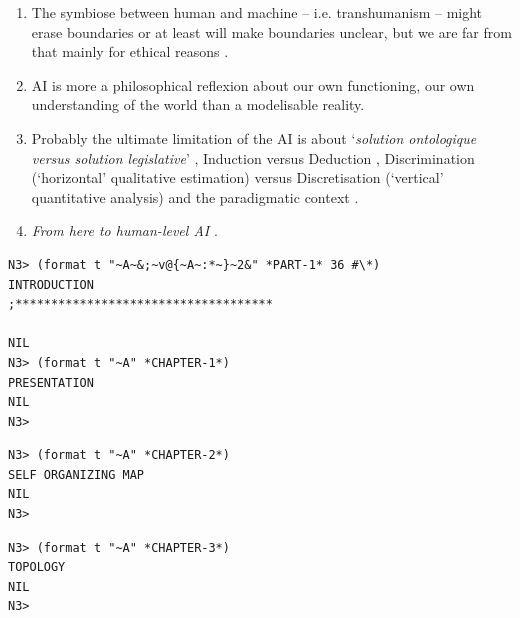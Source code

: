 \documentclass{article}
\begin{document}
\begin{enumerate}[leftmargin=*,label=\underline{\textit{Statement} \arabic*} :]
\item The symbiose between human and machine -- i.e. transhumanism --  might erase boundaries or at least will make boundaries unclear, but we are far from that mainly for ethical reasons \citep{hgw}.  
\item AI is more a philosophical reflexion about our own functioning, our own understanding of the world than a modelisable reality.
\item Probably the ultimate limitation of the AI is about `\textit{solution ontologique versus solution legislative}' \citep{cse}, Induction versus Deduction \citep{fxd}, Discrimination (`horizontal' qualitative estimation) versus  Discretisation (`vertical' quantitative analysis) and the paradigmatic context \citep{herz}.
\item \textit{From here to human-level AI} \citep{jmc}.
\end{enumerate}

\newpage
\begin{spacing}{0.1}
\renewcommand*\contentsname{Contents}
\tableofcontents
\end{spacing}

\bigskip
\bigskip
\renewcommand*\listfigurename{List of figures}
\listoffigures

\bigskip
\bigskip
\renewcommand*{\listtablename}{List of tables}
\listoftables

\bigskip
\bigskip
\bigskip

\begin{lstlisting}[language=sectitle]
N3> (format t "~A~&;~v@{~A~:*~}~2&" *PART-1* 36 #\*)
INTRODUCTION
;************************************

NIL
N3> (format t "~A" *CHAPTER-1*)
PRESENTATION
NIL
N3> 
\end{lstlisting}
{}

\bigskip

\bigskip

\begin{lstlisting}[language=sectitle]
N3> (format t "~A" *CHAPTER-2*)
SELF ORGANIZING MAP
NIL
N3> 
\end{lstlisting}

\bigskip

\bigskip

\begin{lstlisting}[language=sectitle]
N3> (format t "~A" *CHAPTER-3*)
TOPOLOGY
NIL
N3> 
\end{lstlisting}
\label{topology}
\end{document}
